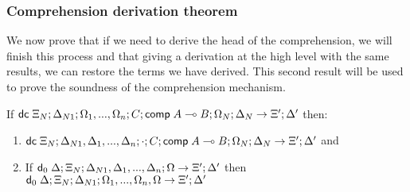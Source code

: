 \subsubsection{Comprehension derivation theorem}

We now prove that if we need to derive the head of the comprehension, we will finish this process and that
giving a derivation at the high level with the same results, we can restore the terms we have derived. This second result will be used to prove the soundness of the comprehension mechanism. 

If $\mathsf{dc} \; \Xi_N; \Delta_{N1}; \Omega_1, ..., \Omega_n; C; \mathsf{comp} \; A \multimap B; \Omega_N; \Delta_N \rightarrow \Xi'; \Delta'$ then:
\begin{enumerate}
   \item $\mathsf{dc} \; \Xi_N; \Delta_{N1}, \Delta_1, ..., \Delta_n; \cdot; C; \mathsf{comp} \; A \multimap B; \Omega_N; \Delta_N \rightarrow \Xi'; \Delta'$ and
   \item If $\mathsf{d}_0 \; \Delta; \Xi_N; \Delta_{N1}, \Delta_1, ..., \Delta_n; \Omega \rightarrow \Xi'; \Delta'$ then $\mathsf{d}_0 \; \Delta; \Xi_N; \Delta_{N1}; \Omega_1, ..., \Omega_n, \Omega \rightarrow \Xi'; \Delta'$
\end{enumerate}

